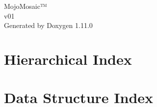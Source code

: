 \documentclass[twoside]{book}
\newcommand{\+}{\discretionary{\mbox{\scriptsize$\hookleftarrow$}}{}{}}
\newcommand{\clearemptydoublepage}{%
    \newpage{\pagestyle{empty}\cleardoublepage}%
  }
\begin{document}
  \raggedbottom
    \hypersetup{pageanchor=false,
                bookmarksnumbered=true,
                pdfencoding=unicode
               }
  \begin{titlepage}
  \vspace*{7cm}
  \begin{center}%
  {\Large Mojo\+Mosaic™}\\
  [1ex]\large v01 \\
  \vspace*{1cm}
  {\large Generated by Doxygen 1.11.0}\\
  \end{center}
  \end{titlepage}
  \clearemptydoublepage
  \tableofcontents
  \clearemptydoublepage
  \hypersetup{pageanchor=true}
\chapter{Hierarchical Index}

\chapter{Data Structure Index}

\end{document}
